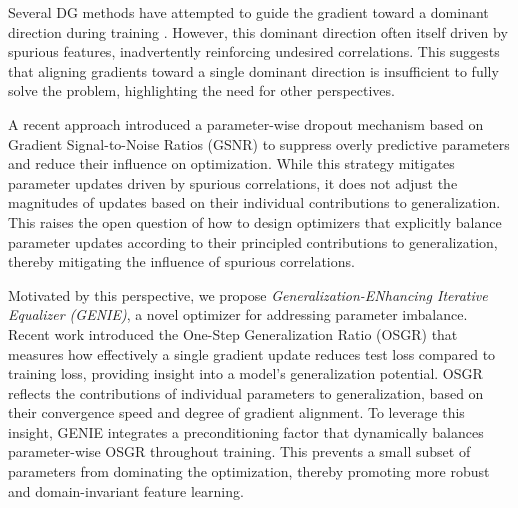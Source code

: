 \documentclass{article}
\theoremstyle{plain}
\theoremstyle{definition}
\theoremstyle{remark}
\begin{document}
Several DG methods have attempted to guide the gradient toward a dominant direction during training \cite{and-mask, sand-mask, fish, fishr}. However, this dominant direction often itself driven by spurious features, inadvertently reinforcing undesired correlations. This suggests that aligning gradients toward a single dominant direction is insufficient to fully solve the problem, highlighting the need for other perspectives. 

A recent approach \cite{dg_dropout} introduced a parameter-wise dropout mechanism based on Gradient Signal-to-Noise Ratios (GSNR) to suppress overly predictive parameters and reduce their influence on optimization. While this strategy mitigates parameter updates driven by spurious correlations, it does not adjust the magnitudes of updates based on their individual contributions to generalization. This raises the open question of how to design optimizers that explicitly balance parameter updates according to their principled contributions to generalization, thereby mitigating the influence of spurious correlations.

Motivated by this perspective, we propose \textit{Generalization-ENhancing Iterative Equalizer (GENIE)}, a novel optimizer for addressing parameter imbalance. Recent work \cite{gsnr} introduced the One-Step Generalization Ratio (OSGR) that measures how effectively a single gradient update reduces test loss compared to training loss, providing insight into a model’s generalization potential. OSGR reflects the contributions of individual parameters to generalization, based on their convergence speed and degree of gradient alignment. To leverage this insight, GENIE integrates a preconditioning factor that dynamically balances parameter-wise OSGR throughout training. This prevents a small subset of parameters from dominating the optimization, thereby promoting more robust and domain-invariant feature learning.
\end{document}
